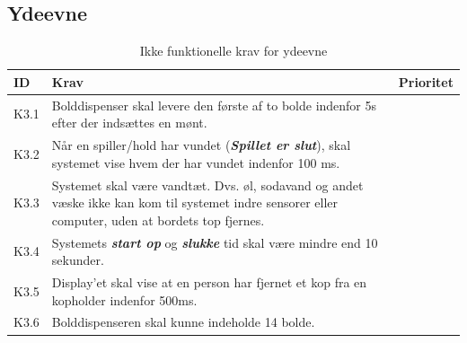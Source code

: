 \documentclass[Kravspecifikation/Kravspec_Main.tex]{subfiles}
\begin{document}
\subsection{Ydeevne}
\begin{table}[H]
\begin{tabular}{|L{0.1\textwidth}|L{0.75\textwidth}|L{0.15\textwidth}|}
\hline
\textbf{ID} & \textbf{Krav} & \textbf{Prioritet} \\ \hline
K3.1 & Bolddispenser skal levere den første af to bolde indenfor 5s efter der indsættes en mønt. &  \\ \hline
K3.2 & Når en spiller/hold har vundet (\textit{\textbf{Spillet er slut}}), skal systemet vise hvem der har vundet indenfor 100 ms. &  \\ \hline
K3.3 & Systemet skal være vandtæt. Dvs. øl, sodavand og andet væske ikke kan kom til systemet indre sensorer eller computer, uden at bordets top fjernes. &  \\ \hline
K3.4 & Systemets \textbf{\textit{start op}} og \textbf{\textit{slukke}} tid skal være mindre end 10 sekunder. &  \\ \hline
K3.5 & Display'et skal vise at en person har fjernet et kop fra en kopholder indenfor 500ms. &  \\ \hline
K3.6 & Bolddispenseren skal kunne indeholde 14 bolde. & \\ \hline
\end{tabular}
\caption{Ikke funktionelle krav for ydeevne}
\label{tab:ydeevne}
\end{table}
\end{document}
